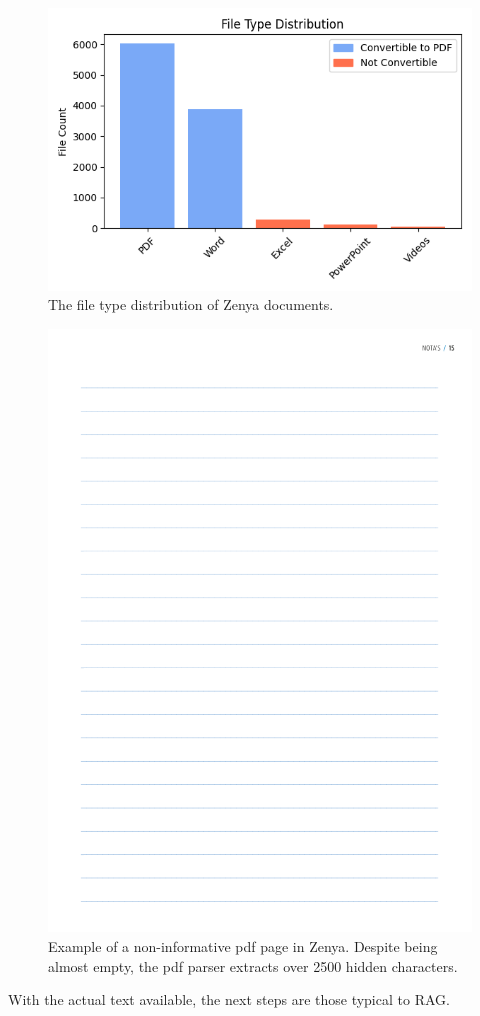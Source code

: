 \begin{figure}[H]
    \captionsetup{justification=centering}
    \centerline{\includegraphics[width=0.7\linewidth]{fig/file_type_distribution.png}}
    \caption{The file type distribution of Zenya documents.}
    \label{fig:file_type_distribution}
\end{figure}

\begin{figure}[H]
    \centerline{\includegraphics[width=0.5\linewidth]{fig/pdf_clutter.png}}
    \caption{Example of a non-informative pdf page in Zenya. Despite being almost empty, the pdf parser extracts over 2500 hidden characters.}
    \label{fig:pdf_clutter}
\end{figure}

With the actual text available, the next steps are those typical to RAG. 

